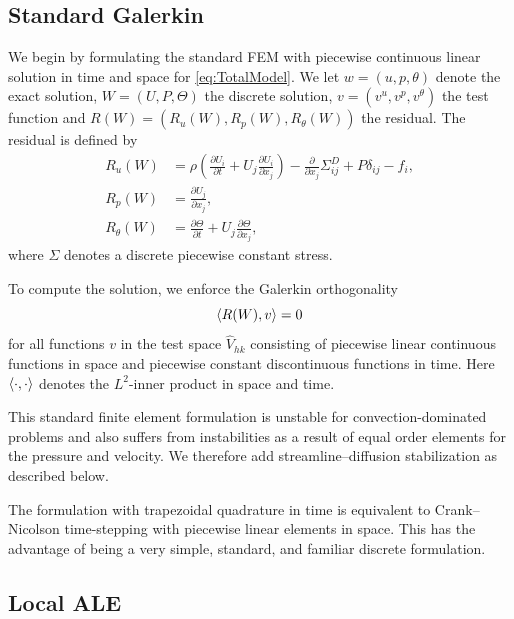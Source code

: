 \subsection{Standard Galerkin}

We begin by formulating the standard \cgone{}\cgone{} FEM
\citep{ErikssonEstepHansboEtAl1996} with piecewise continuous linear
solution in time and space for \eqref{eq:TotalModel}. We let $w = (u,
  p, \theta)$ denote the exact solution, $W = (U, P, \Theta)$ the
discrete solution, $v = (v^u, v^p, v^\theta)$ the test function and
$R(W) = (R_u(W), R_p(W), R_\theta(W))$ the residual. The residual is defined by
\begin{equation} \label{eq:TotalModel}
  \begin{split}
    R_u(W) &= \rho\left(\frac{\partial U_i}{\partial t} + U_j \frac{\partial U_i}{\partial x_j} \right) - \frac{\partial}{\partial x_j} \Sigma^D_{ij} + P \delta_{ij} - f_i,\\
    R_p(W) &= \frac{\partial U_j}{\partial x_j},\\
    R_\theta(W) &= \frac{\partial\Theta}{\partial t} + U_j \frac{\partial \Theta}{\partial x_j},
  \end{split}
\end{equation}
where $\Sigma$ denotes a discrete piecewise constant stress.

To compute the solution, we enforce the Galerkin orthogonality
\begin{equation}
  \langle R(W), v \rangle = 0
\end{equation}
for all functions $v$ in the test space $\hat{V}_{hk}$ consisting of
piecewise linear continuous functions in space and piecewise constant
discontinuous functions in time. Here $\langle \cdot, \cdot \rangle$ denotes
the $L^2$-inner product in space and time.

This standard finite element formulation is unstable for
convection-dominated problems and also suffers from instabilities as a
result of equal order elements for the pressure and velocity. We
therefore add streamline--diffusion stabilization as described below.

The \cgone{}\cgone{} formulation with trapezoidal quadrature in time
is equivalent to Crank--Nicolson time-stepping with piecewise linear
elements in space. This has the advantage of being a very simple,
standard, and familiar discrete formulation.

\subsection{Local ALE}
\label{sec:hoffman-2:ale}

